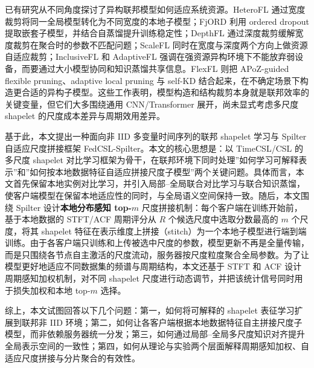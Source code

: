 \documentclass{article}
\begin{document}
已有研究从不同角度探讨了异构联邦模型如何适应系统资源。HeteroFL 通过宽度裁剪将同一全局模型转化为不同宽度的本地子模型\cite{heterofl}；FjORD 利用 ordered dropout 提取嵌套子模型，并结合自蒸馏提升训练稳定性\cite{fjord}；DepthFL 通过深度裁剪缓解宽度裁剪在聚合时的参数不匹配问题\cite{depthfl}；ScaleFL 同时在宽度与深度两个方向上做资源自适应裁剪\cite{scalefl}；InclusiveFL 和 AdaptiveFL 强调在强资源异构环境下不能放弃弱设备，而要通过大小模型协同和知识蒸馏共享信息\cite{inclusivefl,adaptivefl}。FlexFL 则把 APoZ-guided flexible pruning、adaptive local pruning 与 self-KD 结合起来，在不确定场景下构造更合适的异构子模型\cite{flexfl}。这些工作表明，模型构造和结构裁剪本身就是联邦效率的关键变量，但它们大多围绕通用 CNN/Transformer 展开，尚未显式考虑多尺度 shapelet 的尺度成本差异与周期效用差异。

基于此，本文提出一种面向非 IID 多变量时间序列的联邦 shapelet 学习与 Spilter 自适应尺度拼接框架 FedCSL-Spilter。本文的核心思想是：以 TimeCSL/CSL 的多尺度 shapelet 对比学习框架为骨干，在联邦环境下同时处理”如何学习可解释表示”和”如何按本地数据特征自适应拼接尺度子模型”两个关键问题。具体而言，本文首先保留本地实例对比学习，并引入局部--全局联合对比学习与联合知识蒸馏，使客户端模型在保留本地适应性的同时，与全局语义空间保持一致。随后，本文围绕 Spilter 设计\textbf{本地分布感知 top-$m$} 尺度拼接机制：每个客户端在训练开始前，基于本地数据的 STFT/ACF 周期评分从 $R$ 个候选尺度中选取分数最高的 $m$ 个尺度，将其 shapelet 特征在表示维度上拼接（stitch）为一个本地子模型进行端到端训练。由于各客户端只训练和上传被选中尺度的参数，模型更新不再是全量传输，而是只围绕各节点自主激活的尺度流动，服务器按尺度粒度聚合全局参数。为了让模型更好地适应不同数据集的频谱与周期结构，本文还基于 STFT 和 ACF 设计周期感知加权机制，对不同 shapelet 尺度进行动态调节，并把该统计信号同时用于损失加权和本地 top-$m$ 选择。

综上，本文试图回答以下几个问题：第一，如何将可解释的 shapelet 表征学习扩展到联邦非 IID 环境；第二，如何让各客户端根据本地数据特征自主拼接尺度子模型，而非依赖服务器统一分发；第三，如何通过局部--全局多尺度知识对齐提升全局表示空间的一致性；第四，如何从理论与实验两个层面解释周期感知加权、自适应尺度拼接与分片聚合的有效性。
\end{document}

